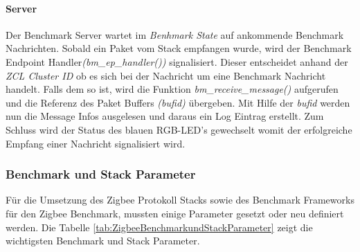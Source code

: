 \paragraph{Server}
Der Benchmark Server wartet im \textit{Benhmark State} auf ankommende Benchmark Nachrichten.
Sobald ein Paket vom Stack empfangen wurde, wird der Benchmark Endpoint Handler\linebreak \textit{(bm\_ep\_handler())} signalisiert.
Dieser entscheidet anhand der \textit{ZCL Cluster ID} ob es sich bei der Nachricht um eine Benchmark Nachricht handelt.
Falls dem so ist, wird die Funktion \textit{bm\_receive\_message()} aufgerufen und die Referenz des Paket Buffers \textit{(bufid)} übergeben.
Mit Hilfe der \textit{bufid} werden nun die Message Infos ausgelesen und daraus ein Log Eintrag erstellt.
Zum Schluss wird der Status des blauen RGB-LED's gewechselt womit der erfolgreiche Empfang einer Nachricht signalisiert wird.




\subsubsection{Benchmark und Stack Parameter}\label{subsubsec:BenchmarkundStackParameter}
Für die Umsetzung des Zigbee Protokoll Stacks sowie des Benchmark Frameworks für den Zigbee Benchmark, mussten einige Parameter gesetzt oder neu definiert werden.
Die Tabelle \ref{tab:ZigbeeBenchmarkundStackParameter} zeigt die wichtigsten Benchmark und Stack Parameter.


